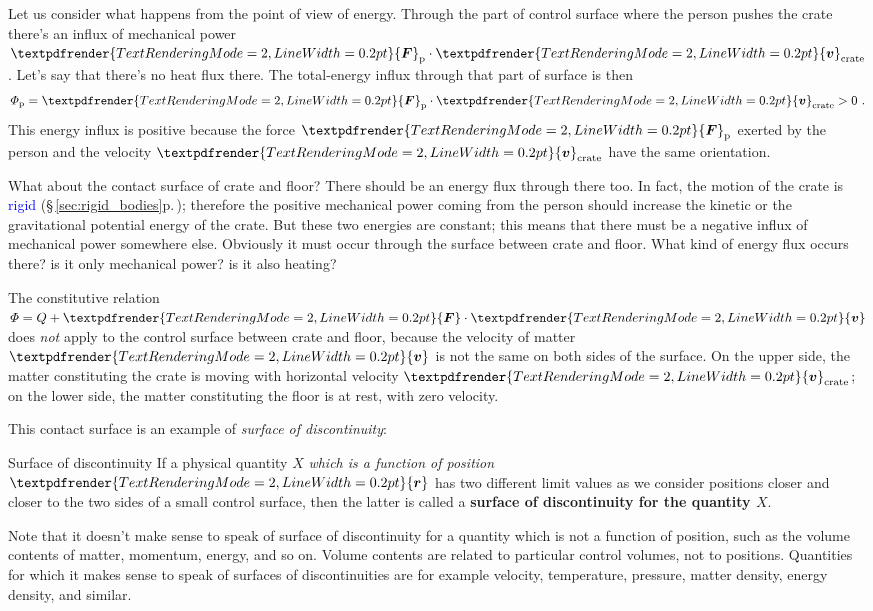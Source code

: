 \documentclass[a4paper,12pt,%
onecolumn,oneside,%
british%
]{memoir}
\renewcommand*{\bm}[1]{\textpdfrender{TextRenderingMode=2,LineWidth=0.2pt}{\boldsymbol{#1}}}
\renewcommand*{\|}[1][]{\nonscript\:#1\vert\nonscript\:\mathopen{}}
\newcommand*{\sect}{\S}%
\renewcommand*{\autoref}[3][\sect\,\ref]{\textcolor{blue}{#3} {\color{blue}\scriptsize(\faIcon[regular]{eye}\;#1{#2}\;p.\,\pageref{#2})}}
\newcommand*{\yr}{\bm{r}}
\newcommand*{\yv}{\bm{v}}
\newcommand*{\yvc}{\yv_{\textrm{crate}}}
\newcommand*{\yH}{\varPhi}%
\newcommand*{\yQ}{Q}%
\newcommand*{\yF}{\bm{F}}
\newcommand*{\yFp}{\yF_{\textrm{p}}}
\begin{document}
Let us consider what happens from the point of view of energy. Through the part of control surface where the person pushes the crate there's an influx of mechanical power $\yFp\cdot\yvc$. Let's say that there's no heat flux there. The total-energy influx through that part of surface is then
\begin{equation*}
  \yH_{\textrm{p}} = \yFp\cdot \yvc > 0 \ .
\end{equation*}
This energy influx is positive because the force $\yFp$ exerted by the person and the velocity $\yvc$ have the same orientation.

What about the contact surface of crate and floor? There should be an energy flux through there too. In fact, the motion of the crate is \autoref{sec:rigid_bodies}{rigid}; therefore the positive mechanical power coming from the person should increase the kinetic or the gravitational potential energy of the crate. But these two energies are constant; this means that there must be a negative influx of mechanical power somewhere else. Obviously it must occur through the surface between crate and floor. What kind of energy flux occurs there? is it only mechanical power? is it also heating?

The constitutive relation $\yH = \yQ + \yF\cdot \yv$ does \emph{not} apply to the control surface between crate and floor, because the velocity of matter $\yv$ is not the same on both sides of the surface. On the upper side, the matter constituting the crate is moving with horizontal velocity $\yvc$; on the lower side, the matter constituting the floor is at rest, with zero velocity.

This contact surface is an example of \emph{surface of discontinuity}:
%
\begin{definition}{Surface of discontinuity}\label{def:surface_discontinuity}
If a physical quantity $X$ \emph{which is a function of position $\yr$} has two different limit values as we consider positions closer and closer to the two sides of a small control surface, then the latter is called a \textbf{surface of discontinuity for the quantity $X$}.
\end{definition}

Note that it doesn't make sense to speak of surface of discontinuity for a quantity which is not a function of position, such as the volume contents of matter, momentum, energy, and so on. Volume contents are related to particular control volumes, not to positions. Quantities for which it makes sense to speak of surfaces of discontinuities are for example velocity, temperature, pressure, matter density, energy density, and similar.
\end{document}
